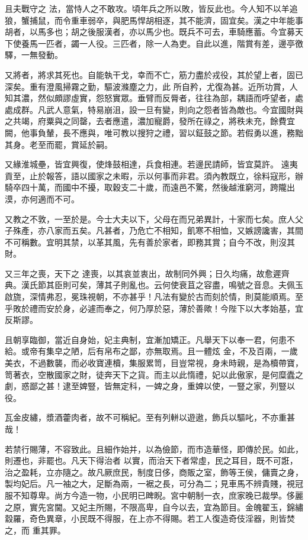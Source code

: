 \begin{pinyinscope}
 且夫戰守之
 法，當恃人之不敢攻。頃年兵之所以敗，皆反此也。今人知不以羊追狼，蟹捕鼠，而令重車弱卒，與肥馬悍胡相逐，其不能濟，固宜矣。漢之中年能事胡者，以馬多也；胡之後服漢者，亦以馬少也。既兵不可去，車騎應蓄。今宜募天下使養馬一匹者，蠲一人役。三匹者，除一人為吏。自此以進，階賞有差，邊亭徼驛，一無發動。



 又將者，將求其死也。自能執干戈，幸而不亡，筋力盡於戎役，其於望上者，固已深矣。重有澄風掃霧之勤，驅波滌塵之力，此
 所自矜，尤復為甚。近所功賞，人知其濃，然似頗謬虛實，怨怒實眾。垂臂而反脣者，往往為部，耦語而呼望者，處處成群。凡武人意氣，特易崩沮，設一旦有變，則向之怨者皆為敵也。今宜國財與之共竭，府粟與之同罄，去者應遣，濃加寵爵，發所在祿之，將秩未充，餘費宜闕，他事負輦，長不應與，唯可教以搜狩之禮，習以鉦鼓之節。若假勇以進，務黜其身。老至而罷，賞延於嗣。



 又緣淮城壘，皆宜興復，使烽鼓相達，兵食相連。若邊民請師，皆宜莫許。
 遠夷貢至，止於報答，語以國家之未暇，示以何事而非君。須內教既立，徐料寇形，辦騎卒四十萬，而國中不擾，取穀支二十歲，而遠邑不驚，然後越淮窮河，跨隴出漠，亦何適而不可。



 又教之不敦，一至於是。今士大夫以下，父母在而兄弟異計，十家而七矣。庶人父子殊產，亦八家而五矣。凡甚者，乃危亡不相知，飢寒不相恤，又嫉謗讒害，其間不可稱數。宜明其禁，以革其風，先有善於家者，即務其賞；自今不改，則沒其財。



 又三年之喪，天下之
 達喪，以其哀並衷出，故制同外興；日久均痛，故愈遲齊典。漢氏節其臣則可矣，薄其子則亂也。云何使衰苴之容盡，鳴號之音息。夫佩玉啟旒，深情弗忍，冕珠視朝，不亦甚乎！凡法有變於古而刻於情，則莫能順焉。至乎敗於禮而安於身，必遽而奉之，何乃厚於惡，薄於善歟！今陛下以大孝始基，宜反斯謬。



 且朝享臨御，當近自身始，妃主典制，宜漸加矯正。凡舉天下以奉一君，何患不給。或帝有集皁之陋，后有帛布之鄙，亦無取焉。且一體炫
 金，不及百兩，一歲美衣，不過數襲，而必收寶連櫝，集服累笥，目豈常視，身未時親，是為櫝帶寶，笥著衣，空散國家之財，徒奔天下之貨。而主以此惰禮，妃以此傲家，是何糜蠹之劇，惑鄙之甚！逮至婢豎，皆無定科，一婢之身，重婢以使，一豎之家，列豎以役。



 瓦金皮繡，漿酒藿肉者，故不可稱紀。至有列軿以遊遨，飾兵以驅叱，不亦重甚哉！



 若禁行賜薄，不容致此。且細作始并，以為儉節，而市造華怪，即傳於民。如此，則遷也，非罷也。凡天下得治者
 以實，而治天下者常虛，民之耳目，既不可誑，治之盈耗，立亦隨之。故凡厥庶民，制度日侈，商販之室，飾等王侯，傭賣之身，製均妃后。凡一袖之大，足斷為兩，一裾之長，可分為二；見車馬不辨貴賤，視冠服不知尊卑。尚方今造一物，小民明已睥睨。宮中朝制一衣，庶家晚已裁學。侈麗之原，實先宮閫。又妃主所賜，不限高卑，自今以去，宜為節目。金魄翟玉，錦繡縠羅，奇色異章，小民既不得服，在上亦不得賜。若工人復造奇伎淫器，則皆焚之，而
 重其罪。




\end{pinyinscope}
